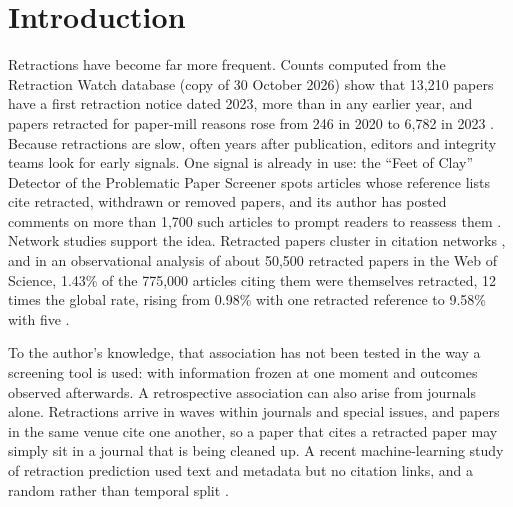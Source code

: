 \section{Introduction}\label{sec:intro}

Retractions have become far more frequent. Counts computed from the Retraction Watch database (copy of 30 October 2026) show that 13,210 papers
have a first retraction notice dated 2023, more than in any earlier year, and papers retracted for paper-mill reasons rose from 246 in 2020 to
6,782 in 2023
\citep{rittman2025rw,candal2022papermills}. Because retractions are slow, often years after publication, editors and integrity
teams look for early signals. One signal is already in use: the ``Feet of Clay'' Detector of the Problematic Paper
Screener \citep{cabanac2022pps} spots articles whose reference lists cite retracted, withdrawn or removed papers, and
its author has posted comments on more than 1,700 such articles to prompt readers to reassess them
\citep{cabanac2024chain}. Network studies support the idea. Retracted papers cluster in citation networks
\citep{feng2024molbio,candal2024references}, and in an observational analysis of about 50,500 retracted papers in the Web of
Science, 1.43\% of the 775,000 articles citing them were themselves retracted, 12 times the global rate, rising from
0.98\% with one retracted reference to 9.58\% with five \citep{lou2026beyond}.

To the author's knowledge, that association has not been tested in the way a screening tool is used: with information frozen at one moment and
outcomes observed afterwards. A retrospective association can also arise from journals alone. Retractions arrive in
waves within journals and special issues, and papers in the same venue cite one another, so a paper that cites a
retracted paper may simply sit in a journal that is being cleaned up. A recent machine-learning study of
retraction prediction used text and metadata but no citation links, and a random rather than temporal split
\citep{fletcher2025predicting}.

